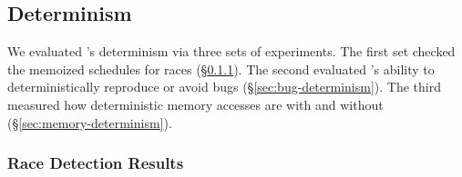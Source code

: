 

\subsection{Determinism}\label{sec:determinism}

We evaluated \tern's determinism via three sets of experiments.  The first
set checked the memoized schedules for races (\S\ref{sec:race-results}).
The second evaluated \tern's ability to deterministically reproduce or avoid
bugs (\S\ref{sec:bug-determinism}).  The third measured how deterministic
memory accesses are with and without
\tern (\S\ref{sec:memory-determinism}).

\subsubsection{Race Detection Results}\label{sec:race-results}

